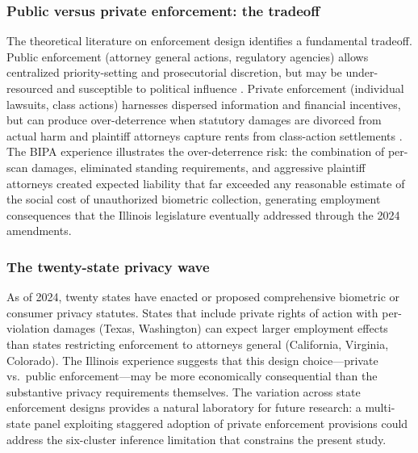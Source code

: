\documentclass[12pt]{article}
\begin{document}
\subsubsection*{Public versus private enforcement: the tradeoff} The theoretical literature on enforcement design identifies a fundamental tradeoff. Public enforcement (attorney general actions, regulatory agencies) allows centralized priority-setting and prosecutorial discretion, but may be under-resourced and susceptible to political influence \citep{beckerstigler1974}. Private enforcement (individual lawsuits, class actions) harnesses dispersed information and financial incentives, but can produce over-deterrence when statutory damages are divorced from actual harm and plaintiff attorneys capture rents from class-action settlements \citep{coffee1986}. The BIPA experience illustrates the over-deterrence risk: the combination of per-scan damages, eliminated standing requirements, and aggressive plaintiff attorneys created expected liability that far exceeded any reasonable estimate of the social cost of unauthorized biometric collection, generating employment consequences that the Illinois legislature eventually addressed through the 2024 amendments.

\subsubsection*{The twenty-state privacy wave} As of 2024, twenty states have enacted or proposed comprehensive biometric or consumer privacy statutes. States that include private rights of action with per-violation damages (Texas, Washington) can expect larger employment effects than states restricting enforcement to attorneys general (California, Virginia, Colorado). The Illinois experience suggests that this design choice---private vs.\ public enforcement---may be more economically consequential than the substantive privacy requirements themselves. The variation across state enforcement designs provides a natural laboratory for future research: a multi-state panel exploiting staggered adoption of private enforcement provisions could address the six-cluster inference limitation that constrains the present study.
\end{document}
